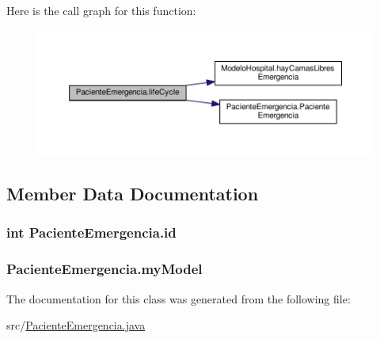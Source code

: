 Here is the call graph for this function\-:\nopagebreak
\begin{figure}[H]
\begin{center}
\leavevmode
\includegraphics[width=350pt]{class_paciente_emergencia_a445b55bb8a640deb5a80ea142969efa7_cgraph}
\end{center}
\end{figure}




\subsection{Member Data Documentation}
\hypertarget{class_paciente_emergencia_a1e71030a4d66cf7c5ad79743c67bc17f}{
\subsubsection[{id}]{\setlength{\rightskip}{0pt plus 5cm}int Paciente\-Emergencia.\-id\hspace{0.3cm}{\ttfamily [private]}}}\label{class_paciente_emergencia_a1e71030a4d66cf7c5ad79743c67bc17f}
\hypertarget{class_paciente_emergencia_aa794154e926dda04cf083d8b2b60737c}{
\subsubsection[{my\-Model}]{ Paciente\-Emergencia.\-my\-Model\hspace{0.3cm}{\ttfamily [private]}}}\label{class_paciente_emergencia_aa794154e926dda04cf083d8b2b60737c}


The documentation for this class was generated from the following file\-:\begin{DoxyCompactItemize}
\item 
src/\hyperlink{_paciente_emergencia_8java}{Paciente\-Emergencia.\-java}\end{DoxyCompactItemize}
